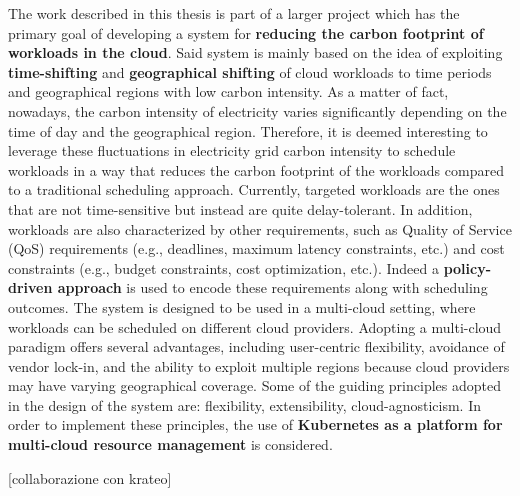 The work described in this thesis is part of a larger project which has the primary goal of developing a system for \textbf{reducing the carbon footprint of workloads in the cloud}.
Said system is mainly based on the idea of exploiting \textbf{time-shifting} and \textbf{geographical shifting} of cloud workloads to time periods and geographical regions with low carbon intensity.
As a matter of fact, nowadays, the carbon intensity of electricity varies significantly depending on the time of day and the geographical region.
Therefore, it is deemed interesting to leverage these fluctuations in electricity grid carbon intensity to schedule workloads in a way that reduces the carbon footprint of the workloads compared to a traditional scheduling approach.
Currently, targeted workloads are the ones that are not time-sensitive but instead are quite delay-tolerant.
In addition, workloads are also characterized by other requirements, such as Quality of Service (QoS) requirements (e.g., deadlines, maximum latency constraints, etc.) and cost constraints (e.g., budget constraints, cost optimization, etc.).
Indeed a \textbf{policy-driven approach} is used to encode these requirements along with scheduling outcomes.
The system is designed to be used in a multi-cloud setting, where workloads can be scheduled on different cloud providers.
Adopting a multi-cloud paradigm offers several advantages, including user-centric flexibility, avoidance of vendor lock-in, and the ability to exploit multiple regions because cloud providers may have varying geographical coverage.
Some of the guiding principles adopted in the design of the system are: flexibility, extensibility, cloud-agnosticism.
In order to implement these principles, the use of \textbf{Kubernetes as a platform for multi-cloud resource management} is considered. \newline

[collaborazione con krateo] %


